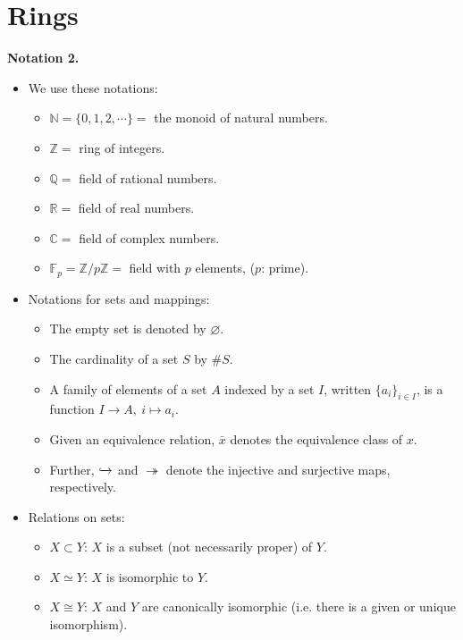 \documentclass[12pt,a4paper,footinclude=true,headinclude=true]{scrbook} %
\newenvironment{notation}[2][Notation]
    { \begin{mdframed}[backgroundcolor=gray!20] \textbf{#1 #2.} }
    {  \end{mdframed}}
\begin{document}
\section{Rings}
\begin{notation}{2}
    \begin{itemize}
        \item[(a)] We use these notations:
        \begin{itemize}[$\bullet$]
            \item $\mathbb{N}=\{0,1,2,\cdots\}=$ the monoid of natural numbers.
            \item $\mathbb{Z}=$ ring of integers.
            \item $\mathbb{Q}=$ field of rational numbers.
            \item $\mathbb{R}=$ field of real numbers.
            \item $\mathbb{C}=$ field of complex numbers.
            \item $\mathbb{F}_p=\mathbb{Z}/p\mathbb{Z}=$ field with $p$ elements, ($p$: prime).
        \end{itemize}
        \item[(b)] Notations for sets and mappings:
        \begin{itemize}[$\bullet$]
            \item The empty set is denoted by $\varnothing$.
            \item The cardinality of a set $S$ by $\# S$.
            \item A family of elements of a set $A$ indexed by a set $I$, written $\{a_i\}_{i\in I}$, is a function $I\to A,\ i\mapsto a_i$.
            \item Given an equivalence relation, $\bar{x}$ denotes the equivalence class of $x$.
            \item Further, $\xhookrightarrow{}$ and $\twoheadrightarrow$ denote the injective and surjective maps, respectively.
        \end{itemize}
        \item[(c)] Relations on sets:
        \begin{itemize}[$\bullet$]
            \item $X\subset Y$: $X$ is a subset (not necessarily proper) of $Y$.
            \item $X\simeq Y$: $X$ is isomorphic to $Y$.
            \item $X\cong Y$: $X$ and $Y$ are canonically isomorphic (i.e. there is a given or unique isomorphism).
        \end{itemize}
    \end{itemize}
\end{notation}
\newpage
\end{document}
